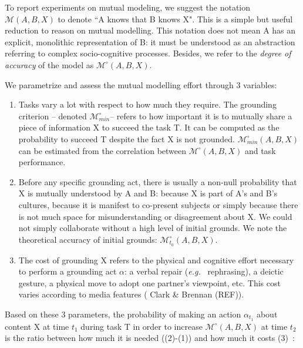 \documentclass[twocolumn]{article}
\newcommand{\eg}{{\textit{e.g.\ }}}
\newcommand{\model}[3]{{$\mathcal{M}(#1, #2, #3)$}}
\newcommand{\Model}[3]{{$\mathcal{M}^{\circ}(#1, #2, #3)$}}
\newcommand{\groundingcriterion}{{$\mathcal{M}^{\circ}_{min}$}}
\begin{document}
To report experiments on mutual modeling, we suggest
the notation \model{A}{B}{X} to denote ``A knows that B knows X". This is a
simple but useful reduction to reason on mutual modelling. This
notation does not mean A has an explicit, monolithic representation of B: it
must be understood as an abstraction referring to complex socio-cognitive
processes. Besides, we refer to the \emph{degree of accuracy} of the model as
\Model{A}{B}{X}.

We parametrize and assess the mutual modelling effort through 3 variables:

\begin{enumerate}

    \item Tasks vary a lot with respect to how much they require.  The grounding
        criterion -- denoted \groundingcriterion -- refers to how
        important it is to mutually share a piece of information X to succeed
        the task T. It can be computed as the probability to succeed T despite
        the fact X is not grounded. $\mathcal{M}^{\circ}_{min}(A,B,X)$ can be
        estimated from the correlation between \Model{A}{B}{X} and task
        performance. 

    \item Before any specific grounding act, there is usually a non-null probability
        that X is mutually understood by A and B: because X is part of A's and
        B's cultures, because it is manifest to co-present subjects or simply
        because there is not much space for misunderstanding or disagreement
        about X. We could not simply collaborate without a high level of initial
        grounds. We note the theoretical accuracy of initial grounds:
        $\mathcal{M}^{\circ}_{t_0}(A,B,X)$.

    \item The cost of grounding X refers to the physical and cognitive effort
        necessary to perform a grounding act $\alpha$: a verbal repair (\eg
        rephrasing), a deictic gesture, a physical move to adopt one partner's
        viewpoint, etc. This cost varies according to media features ( Clark \&
        Brennan (REF)). 

\end{enumerate}

Based on these 3 parameters, the probability of making an action $\alpha_{t_1}$ about
content X at time $t_1$ during task T in order to increase \Model{A}{B}{X}
at time $t_2$ is the ratio between how much it is needed  ((2)-(1)) and how much it
costs (3)~\citep{traum1996miscommunication}:
\end{document}
